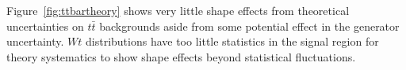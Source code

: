 %

Figure~\ref{fig:ttbartheory} shows very little shape effects from theoretical uncertainties on $t\bar{t}$ backgrounds aside from some potential effect in the generator uncertainty. $Wt$ distributions have too little statistics in the signal region for theory systematics to show shape effects beyond statistical fluctuations.

